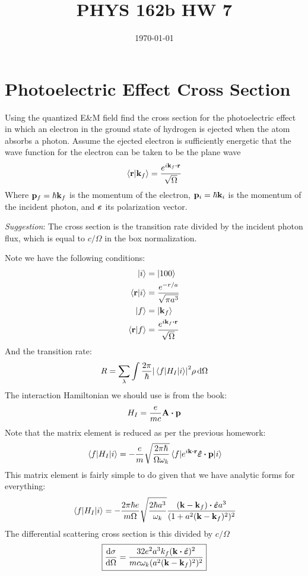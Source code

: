 \documentclass[12pt]{article}
\title{\vspace{-3em}PHYS 162b HW 7}
\date{\today}
\begin{document}
\maketitle

\section{Photoelectric Effect Cross Section}
\begin{problem}
  Using the quantized E\&M field find the cross section for the photoelectric effect in which an electron in the ground state of hydrogen is ejected when the atom absorbs a photon. Assume the ejected electron is sufficiently energetic that the wave function for the electron can be taken to be the plane wave
  \begin{align*}
    \ip{\vb{r}}{\vb{k}_f}=\frac{e^{i\vb{k}_f\vdot\vb{r}}}{\sqrt{\Omega}}
  \end{align*}
  Where $\vb{p}_f=\hbar\vb{k}_f$ is the momentum of the electron, $\vb{p}_i=\hbar\vb{k}_i$ is the momentum of the incident photon, and $\bm{\varepsilon}$ its polarization vector.

  \emph{Suggestion}: The cross section is the transition rate divided by the incident photon flux, which is equal to $c/\Omega$ in the box normalization.
\end{problem}
Note we have the following conditions:
\begin{align*}
  \ket{i}&=\ket{100}\\
  \ip{\vb{r}}{i}&=\frac{e^{-r/a}}{\sqrt{\pi a^3}}\\
  \ket{f}&=\ket{\vb{k}_f}\\
  \ip{\vb{r}}{f}&=\frac{e^{i\vb{k}_f\vdot\vb{r}}}{\sqrt{\Omega}}
\end{align*}
And the transition rate:
\begin{align*}
  R=\sum_\lambda\int\frac{2\pi}{\hbar}\abs{\mel{f}{H_I}{i}}^2\rho\dd{\Omega}
\end{align*}
The interaction Hamiltonian we should use is from the book:
\begin{align*}
  H_I=\frac{e}{mc}\vb{A\vdot p}
\end{align*}
Note that the matrix element is reduced as per the previous homework:
\begin{align*}
  \mel{f}{H_I}{i}=-\frac{e}{m}\sqrt{\frac{2\pi\hbar}{\Omega\omega_{k}}}
  \mel{f}{e^{i\vb{k\vdot r}}\bm{\hat{\veps}}\vdot\vb{p}}{i}
\end{align*}
This matrix element is fairly simple to do given that we have analytic forms for everything:
\begin{align*}
  \mel{f}{H_I}{i}=-\frac{2\pi\hbar e}{m\Omega}
  \sqrt{\frac{2\hbar a^3}{\omega_k}}
  \frac{(\vb{k-k}_f)\vdot\hat{\bm{\veps}}a^3}{(1+a^2(\vb{k-k}_f)^2)^2}
\end{align*}
The differential scattering cross section is this divided by $c/\Omega$
\begin{align}
  \boxed{\dv{\sigma}{\Omega}=\frac{32e^2a^3k_f(\vb{k}\vdot\hat{\bm{\veps}})^2}
  {mc\omega_k(a^2(\vb{k-k}_f)^2)^2}}
\end{align}
\end{document}
